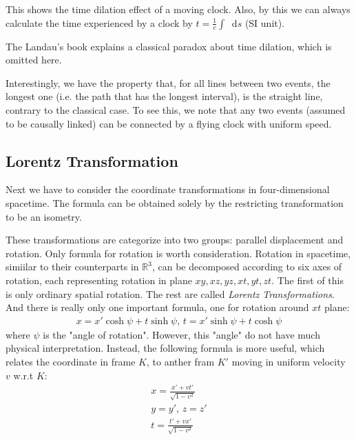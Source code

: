 \documentclass{article}
\newcommand*\diff{\mathop{}\!\mathrm{d}}
\numberwithin{equation}{subsection} %
\theoremstyle{definition}
\begin{document}
    This shows the time dilation effect of a moving clock.
    Also, by this we can always calculate the time experienced by a clock
    by $t=\frac{1}{c}\int\diff s$ (SI unit).

    The Landau's book \cite{landau} explains a classical paradox about
    time dilation, which is omitted here.

    Interestingly, we have the property that, for all lines between two
    events, the longest one (i.e. the path that has the longest interval),
    is the straight line, contrary to the classical case. To see this,
    we note that any two events (assumed to be causally linked) can be
    connected by a flying clock with uniform speed.

    \subsection{Lorentz Transformation}
    \label{sec:Lorentz_Transformation}
    
    Next we have to consider the coordinate transformations in
    four-dimensional spacetime. The formula can be obtained solely by
    the restricting transformation to be an isometry.

    These transformations are categorize into two groups: parallel
    displacement and rotation. Only formula for rotation is worth
    consideration. Rotation in spacetime, simiilar to their
    counterparts in $\mathbb{R}^3$, can be decomposed according to
    six axes of rotation, each representing rotation in plane
    $xy,xz,yz,xt,yt,zt$. The first of this is only ordinary spatial
    rotation. The rest are called \textit{Lorentz Transformations}.
    And there is really only one important formula, one for 
    rotation around $xt$ plane:
    \begin{align}
        x = x'\cosh\psi + t \sinh\psi\text{, }
        t = x'\sinh\psi + t \cosh\psi
    \end{align}
    where $\psi$ is the "angle of rotation". However, this "angle"
    do not have much physical interpretation. Instead, the following
    formula is more useful, which relates the coordinate in frame
    $K$, to anther fram $K'$ moving in uniform velocity $v$ w.r.t
    $K$:
    \begin{align}
        x = \frac{x'+vt'}{\sqrt{1-v^2}}\nonumber\\
        y = y'\text{, }z = z' \nonumber\\
        t = \frac{t'+v x'}{\sqrt{1-v^2}}
    \end{align}
\end{document}
